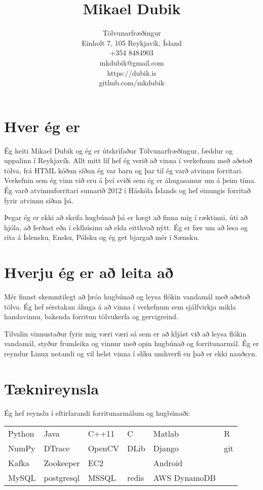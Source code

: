 \documentclass[10pt]{article}
\title{\Huge Mikael Dubik}
\date{}
\author{%
\huge Tölvunarfræðingur\\
\vspace*{8cm}\Large Einholt 7, 105 Reykjavík, Ísland\\
  +354 8484903\\
  mkdubik@gmail.com\\
  https://dubik.is\\
  github.com/mkdubik\\
}
\makeatletter
\renewcommand{\maketitle}{\bgroup\setlength{\parindent}{0pt}
\begin{flushleft}
\textbf{\@title}

\@author
\end{flushleft}\egroup
}
\makeatother
\begin{document}
\maketitle
\thispagestyle{empty}
\newpage

\begin{flushleft}

\section*{Hver ég er}
\large Ég heiti Mikael Dubik og ég er útskrifaður Tölvunarfræðingur, fæddur og uppalinn í Reykjavík. Allt mitt líf hef ég verið að vinna í verkefnum með aðstoð tölva, frá HTML kóðun síðan ég var barn og þar til ég varð atvinnu forritari. Verkefnin sem ég vinn við eru á því sviði sem ég er áhugasamur um á þeim tíma. Ég varð atvinnuforritari sumarið 2012 í Háskóla Íslands og hef einungis forritað fyrir atvinnu síðan þá. \newline

Þegar ég er ekki að skrifa hugbúnað þá er hægt að finna mig í ræktinni, úti að hjóla, að ferðast eða í eldhúsinu að elda eitthvað nýtt. Ég er fær um að lesa og rita á Íslensku, Ensku, Pólsku og ég get bjargað mér í Sænsku.

\section*{Hverju ég er að leita að}
Mér finnst skemmtilegt að þróa hugbúnað og leysa flókin vandamál með aðstoð tölva. Ég hef sérstakan áhuga á að vinna í verkefnum sem sjálfvirkja mikla handavinnu, bakenda forritun tölvukerfa og gervigreind. 

Tilvalin vinnustaður fyrir mig væri væri sá sem er að kljást við að leysa flókin vandamál, styður frumleika og vinnur með opin hugbúnað og forritunarmál. Ég er reyndur Linux notandi og vil helst vinna í slíku umhverfi en það er ekki nauðsyn.

\section*{Tæknireynsla}
Ég hef reynslu í eftirfarandi forritunarmálum og hugbúnaði: \newline

\begin{tabular}{ l l l l l l}
Python & Java & C++11 & C & Matlab & R\\
NumPy & DTrace & OpenCV & DLib & Django & git\\
Kafka & Zookeeper & EC2 &  & Android & \\
MySQL & postgresql & MSSQL & redis & AWS DynamoDB \\
\end{tabular}


\end{flushleft}
\end{document}
